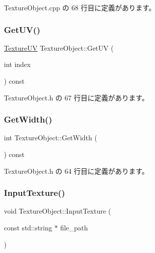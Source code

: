  Texture\+Object.\+cpp の 68 行目に定義があります。

\mbox{\label{class_texture_object_a51b8a2723302c2d38624a62f9205c4bb}} 
\subsubsection{\texorpdfstring{Get\+U\+V()}{GetUV()}}
{\footnotesize\ttfamily \mbox{\hyperlink{struct_texture_object_1_1_texture_u_v}{Texture\+UV}} Texture\+Object\+::\+Get\+UV (\begin{DoxyParamCaption}\item[{int}]{index }\end{DoxyParamCaption}) const\hspace{0.3cm}{\ttfamily [inline]}}



 Texture\+Object.\+h の 67 行目に定義があります。

\mbox{\label{class_texture_object_a72c079770e7e4355b6481d28a0a472ac}} 
\subsubsection{\texorpdfstring{Get\+Width()}{GetWidth()}}
{\footnotesize\ttfamily int Texture\+Object\+::\+Get\+Width (\begin{DoxyParamCaption}{ }\end{DoxyParamCaption}) const\hspace{0.3cm}{\ttfamily [inline]}}



 Texture\+Object.\+h の 64 行目に定義があります。

\mbox{\label{class_texture_object_a93196fc80c026672b8a15cec21ef5dea}} 
\subsubsection{\texorpdfstring{Input\+Texture()}{InputTexture()}}
{\footnotesize\ttfamily void Texture\+Object\+::\+Input\+Texture (\begin{DoxyParamCaption}\item[{const std\+::string $\ast$}]{file\+\_\+path }\end{DoxyParamCaption})\hspace{0.3cm}{\ttfamily [private]}}




